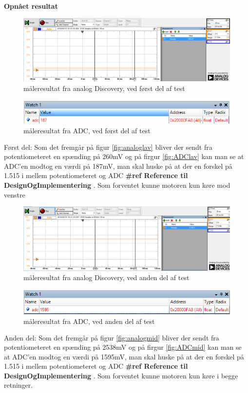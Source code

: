 \textbf{Opnået resultat}
\begin{figure}[H]
	\centering
	\includegraphics[width=\textwidth]{test/images/ModultestADC/260mVanalog}
	\caption{måleresultat fra analog Discovery, ved først del af test}
	\label{figure:analoglav}
\end{figure}
\begin{figure}[H]
	\centering
	\includegraphics[width=\textwidth]{test/images/ModultestADC/nedDebug}
	\caption{måleresultat fra ADC, ved først del af test}
	\label{figure: ADClav}
\end{figure}
Først del: Som det fremgår på figur \ref{fig:analoglav} bliver der sendt fra potentiometeret  en spænding på 260mV og på firgur \ref{fig:ADClav} kan man se at ADC’en modtog en værdi på 187mV, man skal huske på at der en forskel på 1.515 i mellem potentiometeret og ADC \textbf{\#ref Reference til DesignOgImplementering }. 
Som forventet kunne motoren kun køre mod venstre\\
\begin{figure}[H]
	\centering
	\includegraphics[width=\textwidth]{test/images/ModultestADC/2538Vanalog}
	\caption{måleresultat fra analog Discovery, ved anden del af test}
	\label{figure:analogmid}
\end{figure}
\begin{figure}[H]
	\centering
	\includegraphics[width=\textwidth]{test/images/ModultestADC/mellemDebug}
	\caption{måleresultat fra ADC, ved anden del af test}
	\label{figure: ADCmid}
\end{figure}
Anden del: Som det fremgår på figur \ref{fig:analogmid}  bliver der sendt fra potentiometeret en spænding på 2538mV og på firgur \ref{fig:ADCmid}  kan man se at ADC’en modtog en værdi på 1595mV, man skal huske på at der en forskel på 1.515 i mellem potentiometeret og ADC \textbf{\#ref Reference til DesignOgImplementering }. 
Som forventet kunne motoren kun køre i begge retninger.\\


